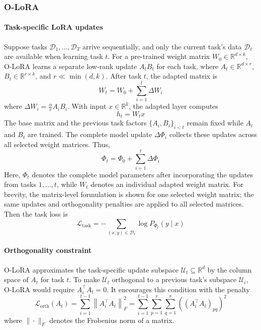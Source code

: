 \subsubsection{O-LoRA}

\paragraph{Task-specific LoRA updates}

Suppose tasks \(\mathcal{D}_1,\ldots,\mathcal{D}_T\) arrive sequentially, and only the current task's data \(\mathcal{D}_t\) are available when learning task \(t\). For a pre-trained weight matrix \(W_0 \in \mathbb{R}^{d \times k}\), O-LoRA \cite{wang2023olora} learns a separate low-rank update \(A_t B_t\) for each task, where \(A_t \in \mathbb{R}^{d \times r}\), \(B_t \in \mathbb{R}^{r\times k}\), and \(r \ll \min(d,k)\). After task \(t\), the adapted matrix is
\[
	W_t = W_0 + \sum_{i=1}^{t} \Delta W_i
\]
where \(\Delta W_i = \frac{\alpha}{r} A_i B_i\).
With input \(x\in\mathbb{R}^{k}\), the adapted layer computes
\[
	h_t = W_t x
\]
The base matrix and the previous task factors \(\{A_i,B_i\}_{i<t}\) remain fixed while \(A_t\) and \(B_t\) are trained.
The complete model update \(\Delta\Phi_i\) collects these updates across all selected weight matrices. Thus,
\[
	\Phi_t = \Phi_0+\sum_{i=1}^{t}\Delta\Phi_i
\]
Here, \(\Phi_t\) denotes the complete model parameters after incorporating the updates from tasks \(1,\ldots,t\), while \(W_t\) denotes an individual adapted weight matrix.
For brevity, the matrix-level formulation is shown for one selected weight matrix; the same updates and orthogonality penalties are applied to all selected matrices.
Then the task loss is
\[
	\mathcal{L}_{\mathrm{task}} =
	- \sum_{(x,y)\in\mathcal{D}_t}\log P_{\Phi_t}(y\mid x)
\]

\paragraph{Orthogonality constraint}

O-LoRA approximates the task-specific update subspace \(\mathcal U_t \subseteq \mathbb{R}^{d}\) by the column space of \(A_t\) for task \(t\). To make \(\mathcal{U}_t\) orthogonal to a previous task's subspace \(\mathcal{U}_i\), O-LoRA would require \(A_i^{\top}A_t=0\). It encourages this condition with the penalty
\[
	\mathcal{L}_{\mathrm{orth}}(A_t)
	= \sum_{i=1}^{t-1} \left\|A_i^{\top} A_t\right\|_F^2
	= \sum_{i=1}^{t-1} \sum_{p=1}^{r}\sum_{q=1}^{r} \left((A_i^{\top} A_t)_{pq}\right)^2
\]
where \(\|\cdot\|_F\) denotes the Frobenius norm of a matrix.

